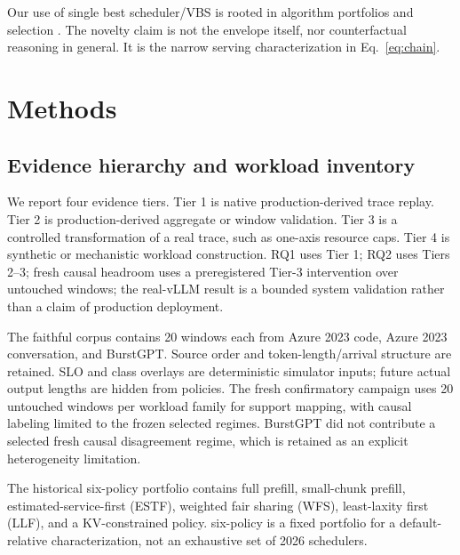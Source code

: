\documentclass[preprint,12pt]{elsarticle}
\begin{document}
Our use of single best scheduler/VBS is rooted in algorithm portfolios and selection
\cite{rice1976algorithmselection,gomes2001portfolios,satzilla2008,autofolio2015}.
The novelty claim is not the envelope itself, nor counterfactual reasoning in
general. It is the narrow serving characterization in Eq.~\ref{eq:chain}.

\section{Methods}
\label{sec:methods}

\subsection{Evidence hierarchy and workload inventory}
We report four evidence tiers. Tier 1 is native production-derived trace replay.
Tier 2 is production-derived aggregate or window validation. Tier 3 is a
controlled transformation of a real trace, such as one-axis resource caps.
Tier 4 is synthetic or mechanistic workload construction. RQ1 uses Tier 1;
RQ2 uses Tiers 2--3; fresh causal headroom uses a preregistered Tier-3
intervention over untouched windows; the real-vLLM result is a bounded system
validation rather than a claim of production deployment.

The faithful corpus contains 20 windows each from Azure 2023 code, Azure 2023
conversation, and BurstGPT. Source order and token-length/arrival structure
are retained. SLO and class overlays are deterministic simulator inputs;
future actual output lengths are hidden from policies. The fresh confirmatory
campaign uses 20 untouched windows per workload family for support mapping,
with causal labeling limited to the frozen selected regimes. BurstGPT did not
contribute a selected fresh causal disagreement regime, which is retained as
an explicit heterogeneity limitation.

The historical six-policy portfolio contains full prefill, small-chunk prefill,
estimated-service-first (ESTF), weighted fair sharing (WFS), least-laxity
first (LLF), and a KV-constrained policy. six-policy is a fixed portfolio for a
default-relative characterization, not an exhaustive set of 2026 schedulers.
\end{document}
